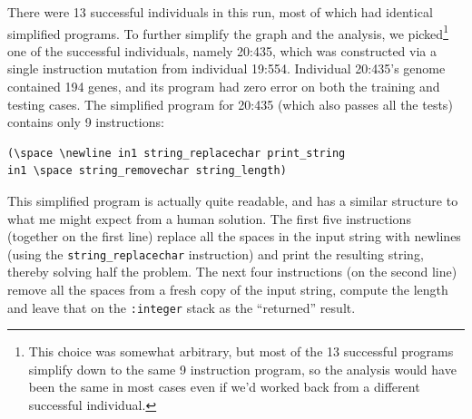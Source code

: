 \documentclass[graybox]{svmult}
\begin{document}
There were 13 successful individuals
in this run, most of which had identical simplified
programs. To further simplify the graph and the analysis, we picked\footnote{This choice 
	was somewhat arbitrary, but most of the 13 successful programs 
	simplify down to the same 9 instruction program, so the analysis would have 
	been the same in most cases even if we'd worked back from a different 
	successful individual.} 
one of the
successful individuals, namely 20:435, which was constructed via a single
instruction mutation from individual 19:554.
Individual 20:435's genome contained 194 genes, and its program had zero error on both
the training and testing cases.
The simplified program for 20:435 (which also passes all the tests)
contains only 9 instructions:
\begin{verbatim}
(\space \newline in1 string_replacechar print_string
in1 \space string_removechar string_length)
\end{verbatim}
This simplified program is actually quite readable, and has a similar
structure to what me might expect from a human solution.
The first five 
instructions (together on the first line) replace all the spaces in the input string 
with newlines (using the \texttt{string\_replacechar} instruction) and print the 
resulting string, thereby solving half the problem. 
The next four instructions (on the second line) remove all the spaces from
a fresh copy of the input string, compute the length and leave that on the
\texttt{:integer} stack as the ``returned'' result.
\end{document}
